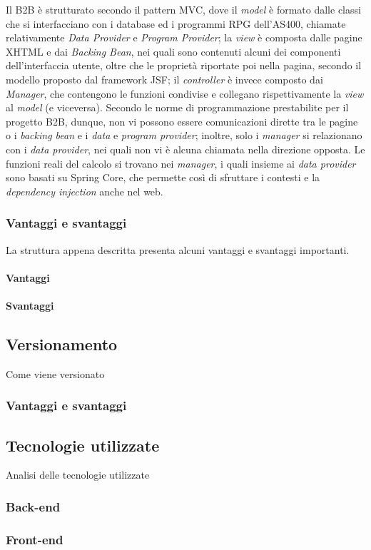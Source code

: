 Il B2B è strutturato secondo il pattern \Gls{MVC}, dove il \textit{model} è formato dalle classi che si interfacciano con i database ed i programmi \Gls{RPG} dell'\Gls{AS400}, chiamate relativamente \textit{Data Provider} e \textit{Program Provider}; la \textit{view} è composta dalle pagine \Gls{XHTML} e dai \textit{Backing Bean}, nei quali sono contenuti alcuni dei componenti dell'interfaccia utente, oltre che le proprietà riportate poi nella pagina, secondo il modello proposto dal \gls{framework} \Gls{JSF}; il \textit{controller} è invece composto dai \textit{Manager}, che contengono le funzioni condivise e collegano rispettivamente la \textit{view} al \textit{model} (e viceversa). Secondo le norme di programmazione prestabilite per il progetto B2B, dunque, non vi possono essere comunicazioni dirette tra le pagine o i \textit{backing bean} e i \textit{data} e \textit{program provider}; inoltre, solo i \textit{manager} si relazionano con i \textit{data provider}, nei quali non vi è alcuna chiamata nella direzione opposta. Le funzioni reali del calcolo si trovano nei \textit{manager}, i quali insieme ai \textit{data provider} sono basati su \Gls{Spring Core}, che permette così di sfruttare i contesti e la \textit{dependency injection} anche nel web.

\subsubsection{Vantaggi e svantaggi}
La struttura appena descritta presenta alcuni vantaggi e svantaggi importanti.
\paragraph{Vantaggi}

\paragraph{Svantaggi}

\subsection{Versionamento}
Come viene versionato
\subsubsection{Vantaggi e svantaggi}

\subsection{Tecnologie utilizzate}
Analisi delle tecnologie utilizzate

\subsubsection{Back-end}

\subsubsection{Front-end}